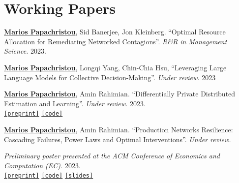 \documentclass[margin]{res}
\newcommand{\specialurl}[2]{\href {#2} {\texttt{[#1]}}}
\newcommand{\preprint}[1]{\specialurl {preprint} {#1}}
\newcommand{\code}[1]{\specialurl {code} {#1}}
\newcommand{\slides}[1]{\specialurl {slides} {#1}}
\newcommand{\authorref}[1]{\underline {\textbf{#1}}}
\newcommand{\authorme}{\authorref{Marios Papachristou}}
\begin{document}
\begin{resume}
\begin{enumerate}[nosep, label={[P\arabic*]}]
\end{enumerate}

\section{Working Papers}


\begin{enumerate}[nosep, label={[W\arabic*]}]   

   \item \authorme, Sid Banerjee, Jon Kleinberg. ``Optimal Resource Allocation for Remediating Networked Contagions''. \emph{R\&R in Management Science.} 2023.

   \item \authorme, Longqi Yang, Chin-Chia Hsu, ``Leveraging Large Language Models for Collective Decision-Making''. \emph{Under review.} 2023

   \item \authorme, Amin Rahimian. ``Differentially Private Distributed Estimation and Learning''. \emph{Under review.} 2023. \\
   	   \preprint{https://arxiv.org/abs/2306.15865} \code{https://github.com/papachristoumarios/dp-distributed-estimation}
   \item \authorme, Amin Rahimian. ``Production Networks Resilience: Cascading Failures, Power Laws and Optimal Interventions''. \emph{Under review.} 
   
   \emph{Preliminary poster presented at the ACM Conference of Economics and Computation (EC).} 2023. \\ \preprint{https://papers.ssrn.com/sol3/papers.cfm?abstract_id=4392226} \code{https://github.com/papachristoumarios/supply-chain-resilience} \slides{https://docs.google.com/presentation/d/1x5IcLvLxY31GME19li0HUgktC9HlEe2u/edit?usp=sharing&ouid=109899272296285628946&rtpof=true&sd=true}
 

\end{enumerate}
\end{resume}
\end{document}
